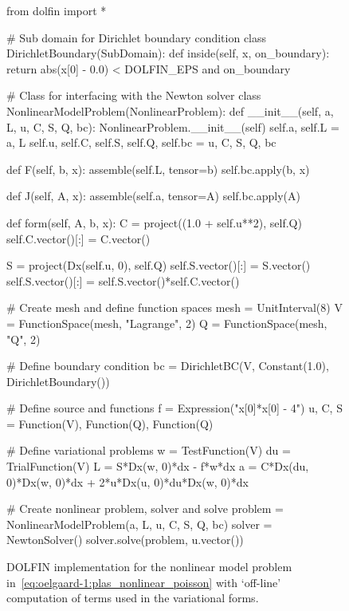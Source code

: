 \begin{figure}
\bwfig
\begin{python}
from dolfin import *

# Sub domain for Dirichlet boundary condition
class DirichletBoundary(SubDomain):
    def inside(self, x, on_boundary):
        return abs(x[0] - 0.0) < DOLFIN_EPS and on_boundary

# Class for interfacing with the Newton solver
class NonlinearModelProblem(NonlinearProblem):
    def __init__(self, a, L, u, C, S, Q, bc):
        NonlinearProblem.__init__(self)
        self.a, self.L = a, L
        self.u, self.C, self.S, self.Q, self.bc = u, C, S, Q, bc

    def F(self, b, x):
        assemble(self.L, tensor=b)
        self.bc.apply(b, x)

    def J(self, A, x):
        assemble(self.a, tensor=A)
        self.bc.apply(A)

    def form(self, A, b, x):
        C = project((1.0 + self.u**2), self.Q)
        self.C.vector()[:] = C.vector()

        S = project(Dx(self.u, 0), self.Q)
        self.S.vector()[:] = S.vector()
        self.S.vector()[:] = self.S.vector()*self.C.vector()

# Create mesh and define function spaces
mesh = UnitInterval(8)
V = FunctionSpace(mesh, "Lagrange", 2)
Q = FunctionSpace(mesh, "Q", 2)

# Define boundary condition
bc = DirichletBC(V, Constant(1.0), DirichletBoundary())

# Define source and functions
f = Expression("x[0]*x[0] - 4")
u, C, S = Function(V), Function(Q), Function(Q)

# Define variational problems
w  = TestFunction(V)
du = TrialFunction(V)
L  = S*Dx(w, 0)*dx - f*w*dx
a  = C*Dx(du, 0)*Dx(w, 0)*dx + 2*u*Dx(u, 0)*du*Dx(w, 0)*dx

# Create nonlinear problem, solver and solve
problem = NonlinearModelProblem(a, L, u, C, S, Q, bc)
solver  = NewtonSolver()
solver.solve(problem, u.vector())
\end{python}
\caption{DOLFIN implementation for the nonlinear model problem
in~\eqref{eq:oelgaard-1:plas_nonlinear_poisson} with `off-line'
computation of terms used in the variational forms.}
\label{fig:oelgaard-1:plas_nonlinear_poisson_code}
\end{figure}

